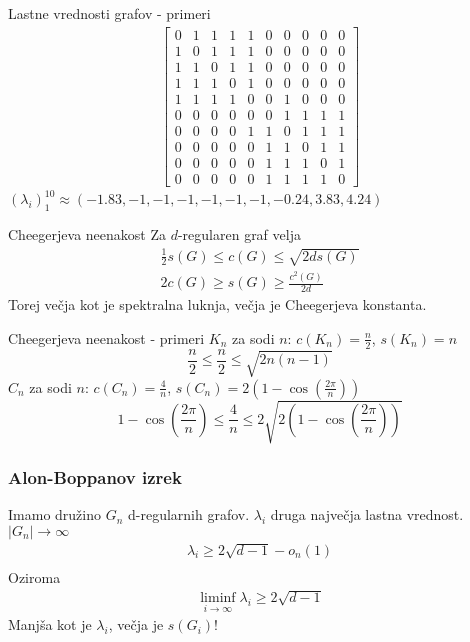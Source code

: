 \documentclass{beamer}
\begin{document}
\begin{frame}{Lastne vrednosti grafov - primeri}
    \begin{align*}
        \begin{bmatrix}
            0 & 1 & 1 & 1 & 1 & 0 & 0 & 0 & 0 & 0 \\
            1 & 0 & 1 & 1 & 1 & 0 & 0 & 0 & 0 & 0 \\
            1 & 1 & 0 & 1 & 1 & 0 & 0 & 0 & 0 & 0 \\
            1 & 1 & 1 & 0 & 1 & 0 & 0 & 0 & 0 & 0 \\
            1 & 1 & 1 & 1 & 0 & 0 & 1 & 0 & 0 & 0 \\
            0 & 0 & 0 & 0 & 0 & 0 & 1 & 1 & 1 & 1 \\
            0 & 0 & 0 & 0 & 1 & 1 & 0 & 1 & 1 & 1 \\
            0 & 0 & 0 & 0 & 0 & 1 & 1 & 0 & 1 & 1 \\
            0 & 0 & 0 & 0 & 0 & 1 & 1 & 1 & 0 & 1 \\
            0 & 0 & 0 & 0 & 0 & 1 & 1 & 1 & 1 & 0
        \end{bmatrix}
    \end{align*}
    \((\lambda_i)_1^{10} \approx (-1.83, -1, -1, -1, -1, -1, -1, -0.24, 3.83, 4.24)\)
\end{frame}
\begin{frame}{Cheegerjeva neenakost}
    Za \(d\)-regularen graf velja
    \begin{align*}
        \frac{1}{2}s(G)\leq c(G) \leq \sqrt{2d s(G)} \\
        2c(G) \geq s(G) \geq \frac{c^2(G)}{2d}
    \end{align*}
    Torej večja kot je spektralna luknja, večja je Cheegerjeva konstanta.
\end{frame}
\begin{frame}{Cheegerjeva neenakost - primeri}
    \(K_n\) za sodi \(n\): \(c(K_n) = \frac{n}{2}\), \(s(K_n) = n\)
    \[
        \frac{n}{2} \leq \frac{n}{2} \leq \sqrt{2n(n-1)}
    \]
    \(C_n\) za sodi \(n\): \(c(C_n) = \frac{4}{n}\), \(s(C_n) = 2\left(1-\cos\left(\frac{2\pi}{n}\right)\right)\)
    \[
        1-\cos\left(\frac{2\pi}{n}\right) \leq \frac{4}{n} \leq 2\sqrt{2\left(1-\cos\left(\frac{2\pi}{n}\right)\right)}
    \]
\end{frame}
\begin{frame}
    \frametitle{Alon-Boppanov izrek}
    Imamo družino \(G_n\) d-regularnih grafov. \(\lambda_i\) druga največja lastna vrednost. \(|G_n| \to \infty\)
    \begin{align*}
        \lambda_i \geq 2\sqrt{d-1} -o_n(1) \\
    \end{align*}
    Oziroma
    \begin{align*}
        \liminf_{i\to\infty} \lambda_i \geq 2\sqrt{d-1}
    \end{align*}
    Manjša kot je \(\lambda_i\), večja je \(s(G_i)\)!
\end{frame}
\end{document}
